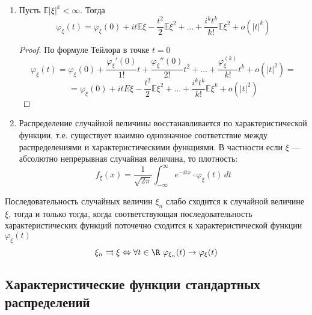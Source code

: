 \begin{prop}
\begin{enumerate}
              \begin{proof}
                  Доказательство существования непрерывности опустим
                  \[ \varphi_\xi^{(k)}(0) = \left(\frac{\partial^k}{\partial t^k} Ee^{it\xi}\right) = \mathbb{E}\left(\frac{\partial^k}{\partial t^k} e^{it\xi}\right) = \mathbb{E}(i^k\xi^ke^{it\xi}) \xlongequal[t = 0]{} \mathbb{E}(i^k \xi^k e^0) = i^k\cdot \mathbb{E}\xi^k \]
              \end{proof}
        \item
              Пусть \(\mathbb{E}|\xi|^k < \infty\). Тогда
              \[ \varphi_\xi(t) = \varphi_\xi(0) + it \mathbb{E}\xi - \frac{t^2}{2}\mathbb{E}\xi^2 + \dots + \frac{i^kt^k}{k!}\mathbb{E}\xi^2 + o(|t|^k) \]

              \begin{proof}
                  По формуле Тейлора в точке \(t = 0\)
                  \[ \varphi_\xi(t) = \varphi_\xi(0) + \frac{\varphi_\xi'(0)}{1!}t + \frac{\varphi_\xi''(0)}{2!}t^2 + \dots + \frac{\varphi_\xi^{(k)}}{k!}t^k + o(|t|^2) = \]
                  \[ = \varphi_\xi(0) + itE\xi - \frac{t^2}{2}\mathbb{E}\xi^2 + \dots + \frac{i^k t^k}{k!} \mathbb{E}\xi^k + o(|t|^2) \]
              \end{proof}
        \item
              \label{свойство 6 эксп СВ}
              Распределение случайной величины восстанавливается по характеристической функции, т.е. существует взаимно однозначное соответствие между распределениями и характеристическими функциями. В частности если \(\xi\) --- абсолютно непрерывная случайная величина, то плотность:
              \[ f_\xi(x) = \frac{1}{\sqrt{2\pi}}\int_{-\infty}^\infty e^{-itx}\cdot \varphi_\xi(t)\,dt \]

    \end{enumerate}
\end{prop}
\begin{theorem}
    Последовательность случайных величин \(\xi_n\) слабо сходится к случайной величине \(\xi\), тогда и только тогда, когда соответствующая последовательность характеристических функций поточечно сходится к характеристической функции \(\varphi_\xi(t)\)
    \[ \xi_n \rightrightarrows \xi \Leftrightarrow \forall t \in \R\ \varphi_{\xi_n}(t) \to \varphi_\xi(t)  \]
\end{theorem}

\subsection{Характеристические функции стандартных распределений}

